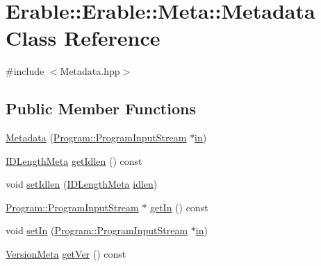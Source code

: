 \hypertarget{class_erable_1_1_erable_1_1_meta_1_1_metadata}{}\section{Erable\+::Erable\+::Meta\+::Metadata Class Reference}
\label{class_erable_1_1_erable_1_1_meta_1_1_metadata}


{\ttfamily \#include $<$Metadata.\+hpp$>$}

\subsection*{Public Member Functions}
\begin{DoxyCompactItemize}
\item 
\mbox{\hyperlink{class_erable_1_1_erable_1_1_meta_1_1_metadata_a08912a3da1b16a012a8dcbd1cb87eebb}{Metadata}} (\mbox{\hyperlink{class_erable_1_1_erable_1_1_program_1_1_program_input_stream}{Program\+::\+Program\+Input\+Stream}} $\ast$\mbox{\hyperlink{class_erable_1_1_erable_1_1_meta_1_1_metadata_a8b9de1048f3739f22de3e00644ef5931}{in}})
\item 
\mbox{\hyperlink{struct_erable_1_1_erable_1_1_meta_1_1_i_d_length_meta}{I\+D\+Length\+Meta}} \mbox{\hyperlink{class_erable_1_1_erable_1_1_meta_1_1_metadata_a6ab03de3323bd273c8b99cfa0cab6a37}{get\+Idlen}} () const
\item 
void \mbox{\hyperlink{class_erable_1_1_erable_1_1_meta_1_1_metadata_a3d8a2560ef6e4c8622b7c21bb0c3ab74}{set\+Idlen}} (\mbox{\hyperlink{struct_erable_1_1_erable_1_1_meta_1_1_i_d_length_meta}{I\+D\+Length\+Meta}} \mbox{\hyperlink{class_erable_1_1_erable_1_1_meta_1_1_metadata_a4cbb333222343f1b01dfff65b5a91b4c}{idlen}})
\item 
\mbox{\hyperlink{class_erable_1_1_erable_1_1_program_1_1_program_input_stream}{Program\+::\+Program\+Input\+Stream}} $\ast$ \mbox{\hyperlink{class_erable_1_1_erable_1_1_meta_1_1_metadata_a76b37f85b4cf071f9351bc67b645e5a5}{get\+In}} () const
\item 
void \mbox{\hyperlink{class_erable_1_1_erable_1_1_meta_1_1_metadata_aaa28a922bf3d148a87a0c2b238c3761d}{set\+In}} (\mbox{\hyperlink{class_erable_1_1_erable_1_1_program_1_1_program_input_stream}{Program\+::\+Program\+Input\+Stream}} $\ast$\mbox{\hyperlink{class_erable_1_1_erable_1_1_meta_1_1_metadata_a8b9de1048f3739f22de3e00644ef5931}{in}})
\item 
\mbox{\hyperlink{struct_erable_1_1_erable_1_1_meta_1_1_version_meta}{Version\+Meta}} \mbox{\hyperlink{class_erable_1_1_erable_1_1_meta_1_1_metadata_a0a22494361bd07155b9eb38a7bc5bc81}{get\+Ver}} () const

\end{DoxyCompactItemize}

